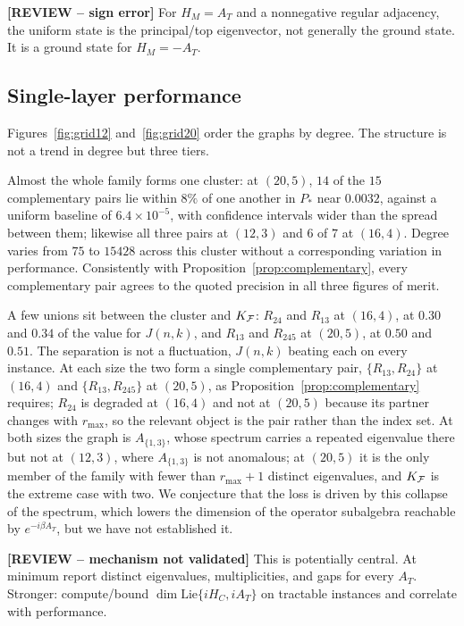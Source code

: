 {\color{red}\textbf{[REVIEW -- sign error]} For $H_M=A_T$ and a nonnegative regular adjacency, the uniform state is the principal/top eigenvector, not generally the ground state. It is a ground state for $H_M=-A_T$.}

\subsection{\label{sec:p1}Single-layer performance}
Figures~\ref{fig:grid12} and~\ref{fig:grid20} order the graphs by degree.
The structure is not a trend in degree but three tiers.

Almost the whole family forms one cluster: at $(20,5)$, $14$ of the $15$
complementary pairs lie within $8\%$ of one another in $P_*$ near
$0.0032$, against a uniform baseline of $6.4\times10^{-5}$, with
confidence intervals wider than the spread between them; likewise all
three pairs at $(12,3)$ and $6$ of $7$ at $(16,4)$. Degree varies from
$75$ to $15428$ across this cluster without a corresponding variation in
performance. Consistently with
Proposition~\ref{prop:complementary}, every complementary pair agrees to
the quoted precision in all three figures of merit.

A few unions sit between the cluster and $K_{\mathcal{F}}$: $R_{24}$ and $R_{13}$
at $(16,4)$, at $0.30$ and $0.34$ of the value for $J(n,k)$, and $R_{13}$
and $R_{245}$ at $(20,5)$, at $0.50$ and $0.51$. The separation is not a
fluctuation, $J(n,k)$ beating each on every instance. At each size the
two form a single complementary pair, $\{R_{13},R_{24}\}$ at $(16,4)$ and
$\{R_{13},R_{245}\}$ at $(20,5)$, as
Proposition~\ref{prop:complementary} requires; $R_{24}$ is degraded at
$(16,4)$ and not at $(20,5)$ because its partner changes with
$r_{\max}$, so the relevant object is the pair rather than the index set.
At both sizes the graph is $A_{\{1,3\}}$, whose spectrum carries a
repeated eigenvalue there but not at $(12,3)$, where $A_{\{1,3\}}$ is not
anomalous; at $(20,5)$ it is the only member of the family with fewer
than $r_{\max}+1$ distinct eigenvalues, and $K_{\mathcal{F}}$ is the extreme case
with two. We conjecture that the loss is driven by this collapse of the
spectrum, which lowers the dimension of the operator subalgebra reachable
by $e^{-i\beta A_T}$, but we have not established it.

{\color{red}\textbf{[REVIEW -- mechanism not validated]} This is potentially central. At minimum report distinct eigenvalues, multiplicities, and gaps for every $A_T$. Stronger: compute/bound $\dim\mathrm{Lie}\{iH_C,iA_T\}$ on tractable instances and correlate with performance.}

